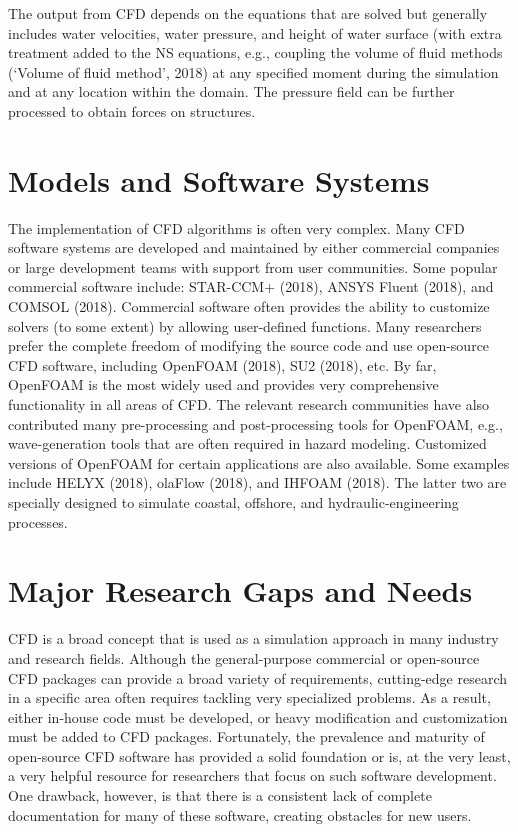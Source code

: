 The output from CFD depends on the equations that are solved but generally includes water velocities, water pressure, and height of water surface (with extra treatment added to the NS equations, e.g., coupling the volume of fluid methods (‘Volume of fluid method’, 2018) at any specified moment during the simulation and at any location within the domain. The pressure field can be further processed to obtain forces on structures.

\section{Models and Software Systems}
\label{sec:resp_cfd_water_methods}

The implementation of CFD algorithms is often very complex. Many CFD software systems are developed and maintained by either commercial companies or large development teams with support from user communities. Some popular commercial software include: STAR-CCM+ (2018), ANSYS Fluent (2018), and COMSOL (2018). Commercial software often provides the ability to customize solvers (to some extent) by allowing user-defined functions. Many researchers prefer the complete freedom of modifying the source code and use open-source CFD software, including OpenFOAM (2018), SU2 (2018), etc. By far, OpenFOAM is the most widely used and provides very comprehensive functionality in all areas of CFD. The relevant research communities have also contributed many pre-processing and post-processing tools for OpenFOAM, e.g., wave-generation tools that are often required in hazard modeling. Customized versions of OpenFOAM for certain applications are also available. Some examples include HELYX (2018), olaFlow (2018), and IHFOAM (2018). The latter two are specially designed to simulate coastal, offshore, and hydraulic-engineering processes.

\section{Major Research Gaps and Needs}
\label{sec:resp_cfd_water_gaps}

CFD is a broad concept that is used as a simulation approach in many industry and research fields. Although the general-purpose commercial or open-source CFD packages can provide a broad variety of requirements, cutting-edge research in a specific area often requires tackling very specialized problems. As a result, either in-house code must be developed, or heavy modification and customization must be added to CFD packages. Fortunately, the prevalence and maturity of open-source CFD software has provided a solid foundation or is, at the very least, a very helpful resource for researchers that focus on such software development.  One drawback, however, is that there is a consistent lack of complete documentation for many of these software, creating obstacles for new users.

